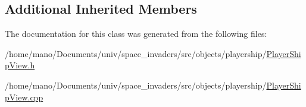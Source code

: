 \subsection*{Additional Inherited Members}


The documentation for this class was generated from the following files\+:\begin{DoxyCompactItemize}
\item 
/home/mano/\+Documents/univ/space\+\_\+invaders/src/objects/playership/\hyperlink{PlayerShipView_8h}{Player\+Ship\+View.\+h}\item
/home/mano/\+Documents/univ/space\+\_\+invaders/src/objects/playership/\hyperlink{PlayerShipView_8cpp}{Player\+Ship\+View.\+cpp}\end{DoxyCompactItemize}
